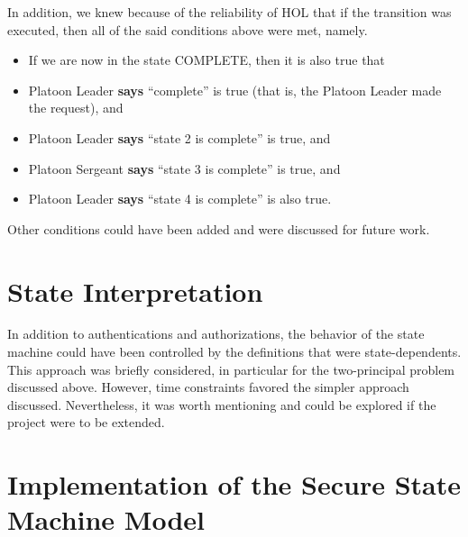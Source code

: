In addition, we knew because of the reliability of HOL that if the transition was executed, then
all of the said conditions above were met, namely.\\

\begin{itemize}
\item If we are now in the state COMPLETE, then it is also true that
\item Platoon Leader \textbf{says} “complete” is true (that is, the Platoon Leader made the request), and
\item Platoon Leader \textbf{says} “state 2 is complete” is true, and
\item Platoon Sergeant \textbf{says} “state 3 is complete” is true, and
  \item Platoon Leader \textbf{says} “state 4 is complete” is also true.
  \end{itemize}
  Other conditions could have been added and were discussed for future work.


\section{State Interpretation}
\label{sec:state-interpretation-1}

In addition to authentications and authorizations, the behavior of the state machine could have
been controlled by the definitions that were state-dependents. This approach was briefly considered,
in particular for the two-principal problem discussed above. However, time constraints favored the
simpler approach discussed. Nevertheless, it was worth mentioning and could be explored if the project
were to be extended.

\section{Implementation of the Secure State Machine Model}
\label{sec:impl-secure-state-1}


